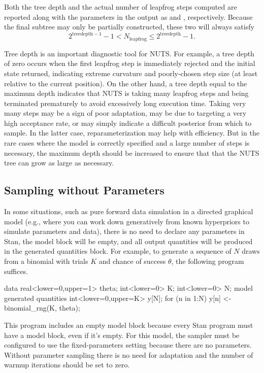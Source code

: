 Both the tree depth and the actual number of leapfrog steps computed
are reported along with the parameters in the output as
 and , respectively. Because
the final subtree may only be partially constructed, these two will
always satisfy
%
\[
2^{\mathrm{treedepth} - 1} - 1 < N_{\mathrm{leapfrog}} \le 2^{\mathrm{treedepth} } - 1.
\]

Tree depth is an important diagnostic tool for NUTS. For example, a
tree depth of zero occurs when the first leapfrog step is immediately
rejected and the initial state returned, indicating extreme curvature
and poorly-chosen step size (at least relative to the current
position). On the other hand, a tree depth equal to the maximum depth
indicates that NUTS is taking many leapfrog steps and being terminated
prematurely to avoid excessively long execution time. Taking very many
steps may be a sign of poor adaptation, may be due to targeting a very
high acceptance rate, or may simply indicate a difficult posterior
from which to sample. In the latter case, reparameterization may help
with efficiency. But in the rare cases where the model is correctly
specified and a large number of steps is necessary, the maximum depth
should be increased to ensure that that the NUTS tree can grow as
large as necessary.


\subsection{Sampling without Parameters}

In some situations, such as pure forward data simulation in a directed
graphical model (e.g., where you can work down generatively from known
hyperpriors to simulate parameters and data), there is no need to
declare any parameters in Stan, the model block will be empty, and all
output quantities will be produced in the generated quantities block.
For example, to generate a sequence of $N$ draws from a binomial with
trials $K$ and chance of success $\theta$, the following program suffices.
%
\begin{stancode}
data {
  real<lower=0,upper=1> theta;
  int<lower=0> K;
  int<lower=0> N;
}
model {
}
generated quantities {
  int<lower=0,upper=K> y[N];
  for (n in 1:N)
    y[n] <- binomial_rng(K, theta);
}
\end{stancode}
%
This program includes an empty model block because every Stan program
must have a model block, even if it's empty.  For this model, the
sampler must be configured to use the fixed-parameters setting because
there are no parameters.  Without parameter sampling there is no need
for adaptation and the number of warmup iterations should be set to
zero.

